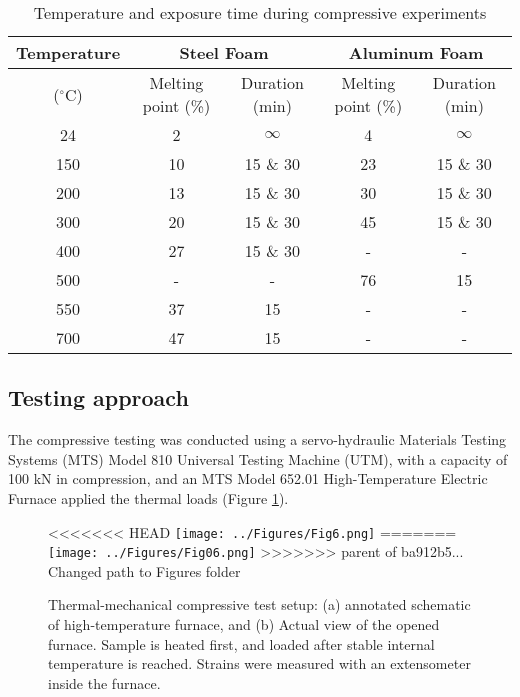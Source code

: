 \documentclass[review]{elsarticle}
\begin{document}
\begin{table}[htbp]
	\centering
	\caption{Temperature and exposure time during compressive experiments}
	\begin{tabular}{ccccc}
		\toprule
		{Temperature} & \multicolumn{2}{c}{Steel Foam}  & \multicolumn{2}{c}{Aluminum Foam} \\
		\midrule
		($^{\circ}\mathrm{C}$) & Melting point (\%) & Duration (min) & Melting point (\%) & Duration (min) \\
		\midrule
		24    & 2     & $\infty$     & 4     & $\infty$ \\
		150   & 10    & 15 \& 30 & 23    & 15 \& 30 \\
		200   & 13    & 15 \& 30 & 30    & 15 \& 30 \\
		300   & 20    & 15 \& 30 & 45    & 15 \& 30 \\
		400   & 27    & 15 \& 30 & -     & - \\
		500   & -     & -     & 76    & 15 \\
		550   & 37    & 15    & -     & - \\
		700   & 47    & 15    & -     & - \\
		\bottomrule
	\end{tabular}%
	\label{Tab1}%
\end{table}%

\subsection{Testing approach}

The compressive testing was conducted using a servo-hydraulic Materials Testing Systems (MTS) Model 810 Universal Testing Machine (UTM), with a capacity of 100 kN in compression, and an MTS Model 652.01 High-Temperature Electric Furnace applied the thermal loads (Figure \ref{MTSFurnace}). 

\begin{figure}[htbp]
	\begin{center}
<<<<<<< HEAD
		\texttt{[image: ../Figures/Fig6.png]}
=======
		\texttt{[image: ../Figures/Fig06.png]}
>>>>>>> parent of ba912b5... Changed path to Figures folder
		\caption{Thermal-mechanical compressive test setup: (a) annotated schematic of high-temperature furnace, and (b) Actual view of the opened furnace. Sample is heated first, and loaded after stable internal temperature is reached. Strains were measured with an extensometer inside the furnace.}
		\label{MTSFurnace}
	\end{center}
\end{figure}
\end{document}
